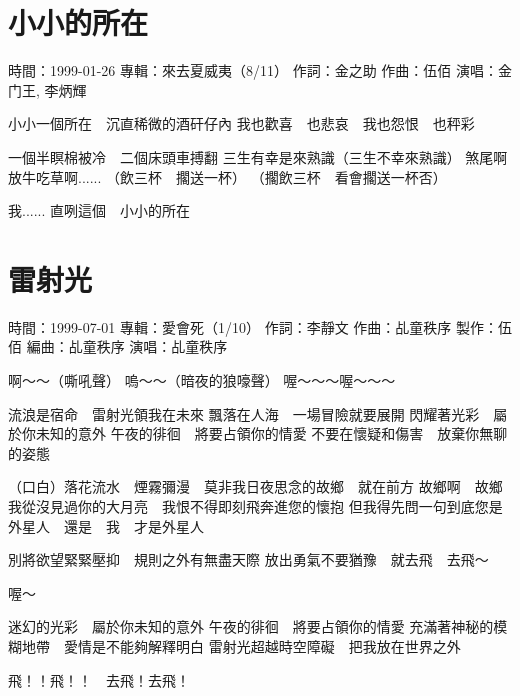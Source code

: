 \documentclass[UTF8,a4paper,oneside,twocolumn,12pt]{ctexbook}
\newcommand{\infopair}[2]{\textbullet #1：#2}
\newcommand{\zc}[1][伍佰]{\infopair{作詞}{#1}}
\newcommand{\zq}[1][伍佰]{\infopair{作曲}{#1}}
\newcommand{\bq}[1][伍佰]{\infopair{編曲}{#1}}
\newcommand{\zj}[1]{\infopair{專輯}{#1}}
\newcommand{\zz}[1]{\infopair{製作}{#1}}
\newcommand{\sj}[1]{\infopair{時間}{#1}}
\newenvironment{info}{\begin{flushleft}\kaishu
	}
	{\end{flushleft}\normalsize\yahei\par}
\newenvironment{lyric}{
	}
{}
\begin{document}
\section{小小的所在}
\begin{info}
	\sj{1999-01-26}
	\zj{來去夏威夷（8/11）}
	\zc[金之助]
	\zq[伍佰]
	\infopair{演唱}{金门王, 李炳輝}
\end{info}
\begin{lyric}
	小小一個所在　沉直稀微的酒矸仔內
	我也歡喜　也悲哀　我也怨恨　也秤彩

	一個半瞑棉被冷　二個床頭車搏翻
	三生有幸是來熟識（三生不幸來熟識）
	煞尾啊放牛吃草啊......
	（飲三杯　擱送一杯）
	（擱飲三杯　看會擱送一杯否）

	我...... 直咧這個　小小的所在
\end{lyric}

\section{雷射光}
\begin{info}
	\sj{1999-07-01}
	\zj{愛會死（1/10）}
	\zc[李靜文]
	\zq[乩童秩序]
	\zz{伍佰}
	\bq[乩童秩序]
	\infopair{演唱}{乩童秩序}
\end{info}
\begin{lyric}
	啊～～（嘶吼聲）
	嗚～～（暗夜的狼嚎聲）
	喔～～～喔～～～

	流浪是宿命　雷射光領我在未來
	飄落在人海　一場冒險就要展開
	閃耀著光彩　屬於你未知的意外
	午夜的徘徊　將要占領你的情愛
	不要在懷疑和傷害　放棄你無聊的姿態

	（口白）落花流水　煙霧彌漫　莫非我日夜思念的故鄉　就在前方
	故鄉啊　故鄉　我從沒見過你的大月亮　我恨不得即刻飛奔進您的懷抱
	但我得先問一句到底您是外星人　還是　我　才是外星人

	別將欲望緊緊壓抑　規則之外有無盡天際
	放出勇氣不要猶豫　就去飛　去飛～

	喔～

	迷幻的光彩　屬於你未知的意外
	午夜的徘徊　將要占領你的情愛
	充滿著神秘的模糊地帶　愛情是不能夠解釋明白
	雷射光超越時空障礙　把我放在世界之外

	飛！！飛！！　去飛！去飛！
\end{lyric}
\end{document}
